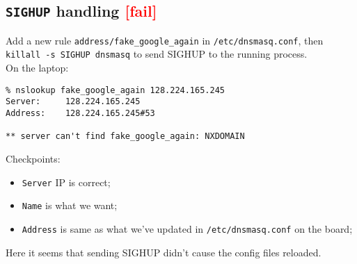 \documentclass[a4paper]{report}
\begin{document}
\subsection{{\tt SIGHUP} handling \textcolor{red}{[fail]}}
Add a new rule {\tt address/fake\_google\_again} in {\tt /etc/dnsmasq.conf}, then
{\tt killall -s SIGHUP dnsmasq} to send SIGHUP to the running process.\\
On the laptop:
\begin{lstlisting}
% nslookup fake_google_again 128.224.165.245
Server:		128.224.165.245
Address:	128.224.165.245#53

** server can't find fake_google_again: NXDOMAIN
\end{lstlisting}
Checkpoints:
\begin{itemize}
    \item {\tt Server} IP is correct;
    \item {\tt Name} is what we want;
    \item {\tt Address} is same as what we've updated in 
          {\tt /etc/dnsmasq.conf} on the board;
\end{itemize}
Here it seems that sending SIGHUP didn't cause the config files reloaded.
\end{document}
